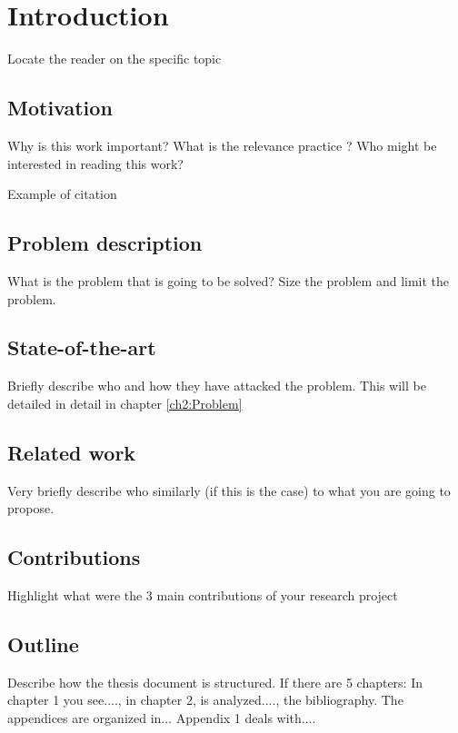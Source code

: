 


\chapter{Introduction}
\label{ch1:Intro}


Locate the reader on the specific topic

\section{Motivation}
\label{ch1:Motivation}

Why is this work important? 
What is the relevance practice ? 
Who might be interested in reading this work?

Example of citation \cite{Meir95}

\section{Problem description}
\label{ch1:Problem}

What is the problem that is going to be solved? 
Size the problem and
limit the problem.

 
\section{State-of-the-art}
\label{ch1:Problem}

Briefly describe who and how they have attacked the problem.
This will be detailed in detail in chapter \ref{ch2:Problem}

\section{Related work}
\label{ch1:RWork}

Very briefly describe who similarly (if this is the
case) to what you are going to propose.

\section{Contributions}
\label{ch1:Contributions}

Highlight what were the 3 main contributions of your research project

\section{Outline}
\label{ch1:Outline}

Describe how the thesis document is structured. 
If there are 5 chapters: In chapter 1 you see...., in chapter 2,
is analyzed...., the bibliography.
The appendices are organized in... Appendix 1 deals with....

\newpage
